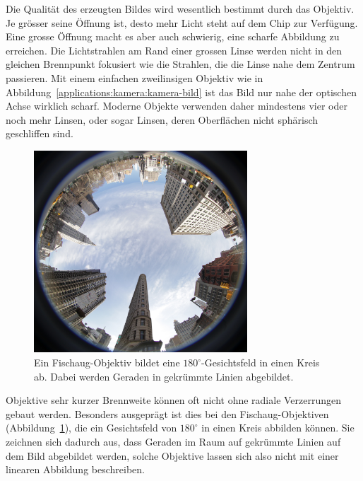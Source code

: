 Die Qualität des erzeugten Bildes wird wesentlich bestimmt durch das
Objektiv.
Je grösser seine Öffnung ist, desto mehr Licht steht auf dem Chip zur
Verfügung.
Eine grosse Öffnung macht es aber auch schwierig, eine scharfe Abbildung
zu erreichen.
Die Lichtstrahlen am Rand einer grossen Linse werden nicht in den gleichen
Brennpunkt fokusiert wie die Strahlen, die die Linse nahe dem Zentrum
passieren.
Mit einem einfachen zweilinsigen Objektiv wie in
Abbildung~\ref{applications:kamera:kamera-bild} ist das Bild nur nahe
der optischen Achse wirklich scharf.
Moderne Objekte verwenden daher mindestens vier oder noch mehr Linsen,
oder sogar Linsen, deren Oberflächen nicht sphärisch geschliffen sind.

\begin{figure}
\centering
\includegraphics[width=8cm]{applications/kamera/fisheye.jpg}
\caption{Ein Fischaug-Objektiv bildet eine $180^\circ$-Gesichtsfeld in
einen Kreis ab.
Dabei werden Geraden in gekrümmte Linien abgebildet.
\label{applications:kamera:fisheye}}
\end{figure}%
Objektive sehr kurzer Brennweite können oft nicht ohne radiale Verzerrungen
gebaut werden.
Besonders ausgeprägt ist dies bei den Fischaug-Objektiven
(Abbildung~\ref{applications:kamera:fisheye}), die
ein Gesichtsfeld von $180^\circ$ in einen Kreis abbilden können.
Sie zeichnen sich dadurch aus, dass Geraden im Raum auf gekrümmte
Linien auf dem Bild abgebildet werden, solche Objektive lassen sich
also nicht mit einer linearen Abbildung beschreiben.

